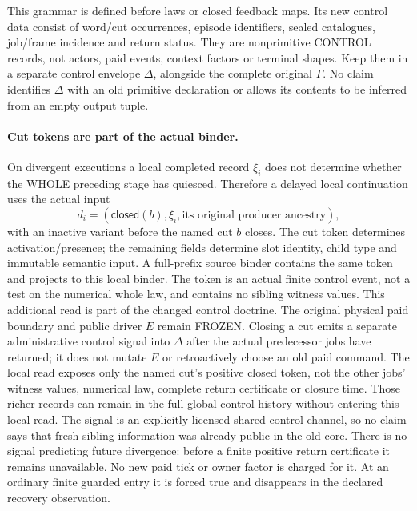 \documentclass[11pt]{article}
\begin{document}
This grammar is defined before laws or closed feedback maps. Its new control data consist of word/cut occurrences, episode identifiers, sealed catalogues, job/frame incidence and return status. They are nonprimitive CONTROL records, not actors, paid events, context factors or terminal shapes. Keep them in a separate control envelope $\Delta$, alongside the complete original $\Gamma$. No claim identifies $\Delta$ with an old primitive declaration or allows its contents to be inferred from an empty output tuple.

\paragraph{Cut tokens are part of the actual binder.}
On divergent executions a local completed record $\xi_i$ does not determine whether the WHOLE preceding stage has quiesced. Therefore a delayed local continuation uses the actual input
\[
       d_i=(\mathsf{closed}(b),\xi_i,\text{its original producer ancestry}),
\]
with an inactive variant before the named cut $b$ closes. The cut token determines activation/presence; the remaining fields determine slot identity, child type and immutable semantic input. A full-prefix source binder contains the same token and projects to this local binder. The token is an actual finite control event, not a test on the numerical whole law, and contains no sibling witness values. This additional read is part of the changed control doctrine. The original physical paid boundary and public driver $E$ remain FROZEN. Closing a cut emits a separate administrative control signal into $\Delta$ after the actual predecessor jobs have returned; it does not mutate $E$ or retroactively choose an old paid command. The local read exposes only the named cut's positive closed token, not the other jobs' witness values, numerical law, complete return certificate or closure time. Those richer records can remain in the full global control history without entering this local read. The signal is an explicitly licensed shared control channel, so no claim says that fresh-sibling information was already public in the old core. There is no signal predicting future divergence: before a finite positive return certificate it remains unavailable. No new paid tick or owner factor is charged for it. At an ordinary finite guarded entry it is forced true and disappears in the declared recovery observation.
\end{document}
